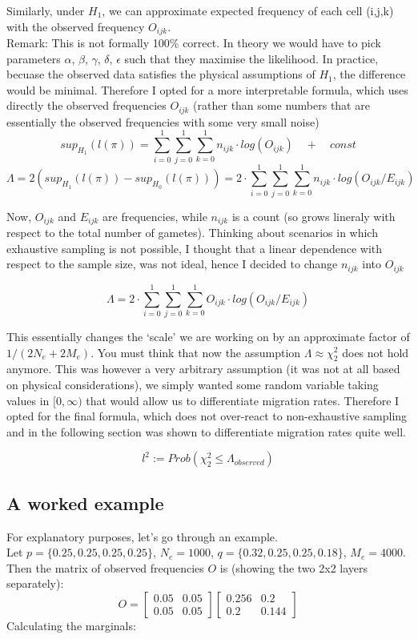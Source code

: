 \documentclass[a4paper,12pt]{article}
\begin{document}
\noindent Similarly, under $H_1$, we can approximate expected frequency of each cell (i,j,k) with the observed frequency $O_{ijk}$.\\ 

\noindent Remark: This is not formally 100\% correct. In theory we would have to pick parameters $\alpha$, $\beta$, $\gamma$, $\delta$, $\epsilon$ such that they maximise the likelihood. In practice, becuase the observed data satisfies the physical assumptions of $H_1$, the difference would be minimal. Therefore I opted for a more interpretable formula, which uses directly the observed frequencies $O_{ijk}$ (rather than some numbers that are essentially the observed frequencies with some very small noise)  
  $$sup_{H_1}(l(\pi)) = \sum_{i = 0}^1  \sum_{j = 0}^1  \sum_{k = 0}^1 n_{ijk}\cdot log(O_{ijk}) \quad + \quad const$$ 
   $$\Lambda = 2(sup_{H_1}(l(\pi)) - sup_{H_0}(l(\pi)) ) = 2 \cdot \sum_{i = 0}^1  \sum_{j = 0}^1  \sum_{k = 0}^1 n_{ijk}\cdot log(O_{ijk}/E_{ijk}) $$
   
\noindent Now, $O_{ijk}$ and $E_{ijk}$ are frequencies, while $n_{ijk}$ is a count (so grows lineraly with respect to the total number of gametes). Thinking about scenarios in which exhaustive sampling is not possible, I thought that a linear dependence with respect to the sample size, was not ideal, hence I decided to change $n_{ijk}$ into $O_{ijk}$
  
  $$\Lambda = 2 \cdot \sum_{i = 0}^1  \sum_{j = 0}^1  \sum_{k = 0}^1 O_{ijk}\cdot log(O_{ijk}/E_{ijk}) $$
  
\noindent This essentially changes the `scale' we are working on by an approximate factor of $1/(2N_e + 2M_e)$. You must think that now the assumption $\Lambda \approx  \chi^2_{2} $ does not hold anymore. This was however a very arbitrary assumption (it was not at all based on physical considerations), we simply wanted some random variable taking values in $[0, \infty)$ that would allow us to differentiate migration rates. Therefore I opted for the final formula, which does not over-react to non-exhaustive sampling and in the following section was shown to differentiate migration rates quite well.

$$ l^2 := Prob(\chi_2^2 \le \Lambda_{observed})$$

\subsection {A worked example}
For explanatory purposes, let's go through an example.\\
\noindent Let $p = \{0.25, 0.25, 0.25, 0.25\}$, $N_e = 1000$, $q = \{0.32, 0.25, 0.25, 0.18\}$, $M_e = 4000$.
Then the matrix of observed frequencies $O$ is (showing the two 2x2 layers separately):
$$ O =
\begin{bmatrix}
0.05 & 0.05\\
0.05 & 0.05
\end{bmatrix} 
\begin{bmatrix}
0.256 & 0.2\\
0.2 & 0.144
\end{bmatrix} 
$$
\noindent Calculating the marginals:\\
\end{document}
